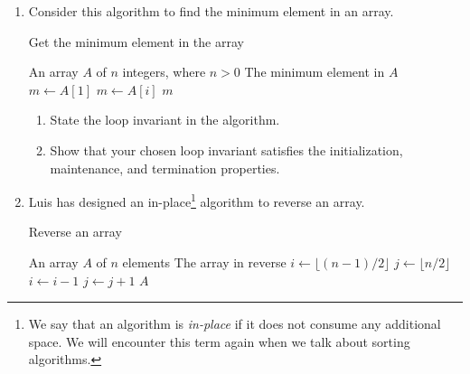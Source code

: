 \begin{exercises}
\begin{enumerate}
        \item Consider this algorithm to find the minimum element in an array.
            \begin{algorithm}[H]
                \caption{Get the minimum element in the array}
                \begin{algorithmic}[1]
                    \Require An array $A$ of $n$ integers, where $n>0$
                    \Ensure The minimum element in $A$
                        \State $m \gets A[1]$
                                \State $m \gets A[i]$
                            \EndIf
                        \EndFor
                        \Return $m$
                    \EndFunction
                \end{algorithmic}
            \end{algorithm}
        \begin{enumerate}
            \item State the loop invariant in the algorithm.
            \item Show that your chosen loop invariant satisfies the initialization, maintenance, and termination properties.
        \end{enumerate}

        \item Luis has designed an in-place\footnote{We say that an algorithm is \textit{in-place} if it does not consume any additional space. We will encounter this term again when we talk about sorting algorithms.} algorithm to reverse an array. 
            \begin{algorithm}[H]
                \caption{Reverse an array}
                \begin{algorithmic}[1]
                    \Require An array $A$ of $n$ elements
                    \Ensure The array in reverse
                        \State $i \gets \lfloor \left(n-1\right)/2 \rfloor$
                        \State $j \gets \lfloor n/2 \rfloor$
                            \State {}
                            \State $i \gets i-1$
                            \State $j \gets j+1$
                        \EndWhile
                        \Return $A$
                    \EndFunction
                \end{algorithmic}
           \end{algorithm}


\end{enumerate}
\end{exercises}
